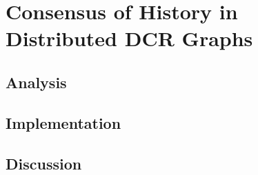 \chapter{Consensus of History in Distributed DCR Graphs}
	\section{Analysis} %
	\section{Implementation} %
	\section{Discussion} %